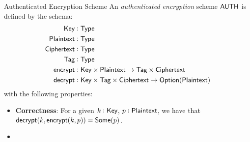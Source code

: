 \begin{definitiontoc}{Authenticated Encryption Scheme}
    An \emph{authenticated encryption} scheme ${\textsf{AUTH}}$ is defined by the schema:
    \begin{align*}
        {\textsf{Key}}        &: {\textsf{Type}} \\
        {\textsf{Plaintext}}  &: {\textsf{Type}} \\
        {\textsf{Ciphertext}} &: {\textsf{Type}} \\
        {\textsf{Tag}}        &: {\textsf{Type}} \\
        {\textsf{encrypt}}    &: {\textsf{Key}} \times {\textsf{Plaintext}} \to {\textsf{Tag}} \times {\textsf{Ciphertext}} \\
        {\textsf{decrypt}}    &: {\textsf{Key}} \times {\textsf{Tag}} \times {\textsf{Ciphertext}} \to {\textsf{Option}}({\textsf{Plaintext}})
    \end{align*}
    with the following properties:
    \begin{itemize}
        \item \textbf{Correctness}: For a given $k : {\textsf{Key}}$, $p : {\textsf{Plaintext}}$, we have that ${\textsf{decrypt}}(k, {\textsf{encrypt}}(k, p)) = {\textsf{Some}}(p)$.
        \item {}
    \end{itemize}
\end{definitiontoc}

